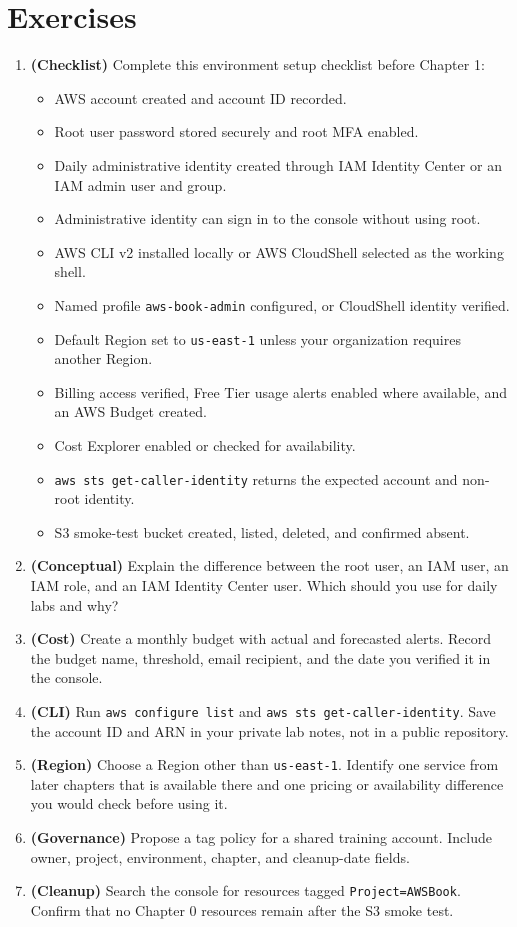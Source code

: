 \section{Exercises}
\begin{enumerate}
    \item \textbf{(Checklist)} Complete this environment setup checklist before Chapter 1:
    \begin{itemize}
        \item AWS account created and account ID recorded.
        \item Root user password stored securely and root MFA enabled.
        \item Daily administrative identity created through IAM Identity Center or an IAM admin user and group.
        \item Administrative identity can sign in to the console without using root.
        \item AWS CLI v2 installed locally or AWS CloudShell selected as the working shell.
        \item Named profile \texttt{aws-book-admin} configured, or CloudShell identity verified.
        \item Default Region set to \texttt{us-east-1} unless your organization requires another Region.
        \item Billing access verified, Free Tier usage alerts enabled where available, and an AWS Budget created.
        \item Cost Explorer enabled or checked for availability.
        \item \texttt{aws sts get-caller-identity} returns the expected account and non-root identity.
        \item S3 smoke-test bucket created, listed, deleted, and confirmed absent.
    \end{itemize}
    \item \textbf{(Conceptual)} Explain the difference between the root user, an IAM user, an IAM role, and an IAM Identity Center user. Which should you use for daily labs and why?
    \item \textbf{(Cost)} Create a monthly budget with actual and forecasted alerts. Record the budget name, threshold, email recipient, and the date you verified it in the console.
    \item \textbf{(CLI)} Run \texttt{aws configure list} and \texttt{aws sts get-caller-identity}. Save the account ID and ARN in your private lab notes, not in a public repository.
    \item \textbf{(Region)} Choose a Region other than \texttt{us-east-1}. Identify one service from later chapters that is available there and one pricing or availability difference you would check before using it.
    \item \textbf{(Governance)} Propose a tag policy for a shared training account. Include owner, project, environment, chapter, and cleanup-date fields.
    \item \textbf{(Cleanup)} Search the console for resources tagged \texttt{Project=AWSBook}. Confirm that no Chapter 0 resources remain after the S3 smoke test.
\end{enumerate}

